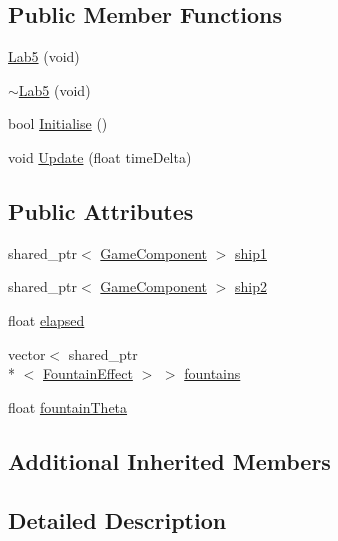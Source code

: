 \subsection*{Public Member Functions}
\begin{DoxyCompactItemize}
\item 
\hyperlink{class_b_g_e_1_1_lab5_a006d3ca3e234146a6d08dda773969eaa}{Lab5} (void)
\item 
\hyperlink{class_b_g_e_1_1_lab5_a2d9f9f591ac367bbd6849ab8756d84df}{$\sim$\-Lab5} (void)
\item 
bool \hyperlink{class_b_g_e_1_1_lab5_a22e9d710c6270571a8f4aa9da3a2f59b}{Initialise} ()
\item 
void \hyperlink{class_b_g_e_1_1_lab5_ae58b0a0640c84a48825a969f8e1396db}{Update} (float time\-Delta)
\end{DoxyCompactItemize}
\subsection*{Public Attributes}
\begin{DoxyCompactItemize}
\item 
shared\-\_\-ptr$<$ \hyperlink{class_b_g_e_1_1_game_component}{Game\-Component} $>$ \hyperlink{class_b_g_e_1_1_lab5_a952366bdf456d393673447ec0a0d5a2c}{ship1}
\item 
shared\-\_\-ptr$<$ \hyperlink{class_b_g_e_1_1_game_component}{Game\-Component} $>$ \hyperlink{class_b_g_e_1_1_lab5_a89e6f26fd06f91ace95ab789e8f5a4d8}{ship2}
\item 
float \hyperlink{class_b_g_e_1_1_lab5_abf967e0c4b39b7707d2079bd1272b320}{elapsed}
\item 
vector$<$ shared\-\_\-ptr\\*
$<$ \hyperlink{class_b_g_e_1_1_fountain_effect}{Fountain\-Effect} $>$ $>$ \hyperlink{class_b_g_e_1_1_lab5_abb82b6dc823adc6bf2a191b90b129c2c}{fountains}
\item 
float \hyperlink{class_b_g_e_1_1_lab5_a94ed12fbc88b8a8deed8e63ab0959492}{fountain\-Theta}
\end{DoxyCompactItemize}
\subsection*{Additional Inherited Members}


\subsection{Detailed Description}


